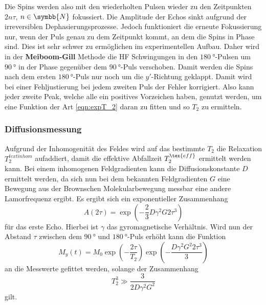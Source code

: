         \noindent Die Spins werden also mit den wiederholten Pulsen wieder zu den Zeitpunkten $2 n \tau$, $n\in \symbb{N}$ fokussiert. Die Amplitude der Echos sinkt aufgrund der irreversiblen Dephasierungsprozesse. 
        Jedoch funktioniert die erneute Fokussierung nur, wenn der Puls genau zu dem Zeitpunkt kommt, an dem die Spins in Phase sind. Dies ist sehr schwer zu ermöglichen im experimentellen Aufbau. 
        Daher wird in der \textbf{Meiboom-Gill} Methode die HF Schwingungen in den $\SI{180}{\degree}$-Pulsen um $\SI{90}{\degree}$ in der Phase gegenüber dem $\SI{90}{\degree}$-Puls verschoben. 
        Damit werden die Spins nach dem ersten $\SI{180}{\degree}$-Puls nur noch um die $y'$-Richtung geklappt. Damit wird bei einer Fehljustierung bei jedem zweiten Puls der Fehler korrigiert. Also kann 
        jeder zweite Peak, welche alle ein positives Vorzeichen haben, genutzt werden, um eine Funktion der Art \eqref{eqn:expT_2} daran zu fitten und so $T_2$ zu ermitteln.
        
    \subsubsection{Diffusionsmessung}

        \noindent Aufgrund der Inhomogenität des Feldes wird auf das bestimmte $T_2$ die Relaxation $T_2^{text{inhom}}$ aufaddiert, damit die effektive Abfallzeit $T_2^{\tex{eff}}$ ermittelt werden kann. 
        Bei einem inhomogenen Feldgradienten kann die Diffusionskonstante $D$ ermittelt werden, da sich nun bei dem bekannten Feldgradienten $G$ eine Bewegung aus der Brownschen Molekularbewegung messbar eine andere Lamorfrequenz ergibt. 
        Es ergibt sich ein exponentieller Zusammenhang 
        \begin{equation*}
            A ( 2 \tau ) = \exp(-\frac{2}{3} D \gamma^2 G2 \tau^3)
        \end{equation*}
        für das erste Echo. Hierbei ist $\gamma$ das gyromagnetische Verhältnis. 
        Wird nun der Abstand $\tau$ zwischen dem $\SI{90}{\degree}$ und $\SI{180}{\degree}$-Puls erhöht kann die Funktion 
        \begin{equation*}
            M_y (t) = M_0 \exp\left(- \frac{2 \tau}{T_2}\right)\exp\left(- \frac{D \gamma^2 G^2 2 \tau^3}{3}\right)
        \end{equation*}
        an die Messwerte gefittet werden, solange der Zusammenhang 
        \begin{equation*}
            T_2^3 \gg \frac{3}{2 D \gamma^2 G^2}
        \end{equation*}
        gilt. 


